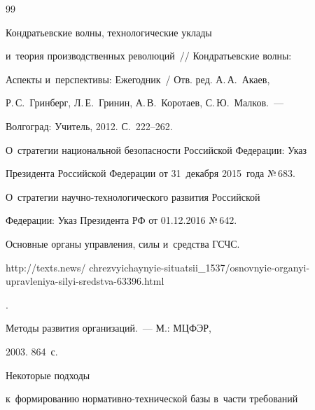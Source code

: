    {\small\frenchspacing


{%




\begin{thebibliography}{99}





\vspace*{-3pt}







      Кондратьевские волны, технологические уклады 


и~теория производственных революций~/\!\!/ Кондратьевские волны: 


Аспекты и~перспективы: Ежегодник~/ Отв. ред. А.\,А.~Акаев, 


Р.\,С.~Гринберг, Л.\,Е.~Гринин, А.\,В.~Коротаев, С.\,Ю.~Малков.~--- 


Волгоград: Учитель, 2012. С.~222--262.




     О~стратегии национальной безопасности Российской Федерации: Указ 


Президента Российской Федерации от 31~декабря 2015~года №\,683.




     О~стратегии научно-технологического развития Российской 


Федерации: Указ Президента РФ от 01.12.2016 №\,642.




     Основные органы управления, силы и~средства ГСЧС. {\sf 


http://texts.news/ chrezvyichaynyie-situatsii\_1537/osnovnyie-organyi-upravleniya-silyi-sredstva-63396.html}.




      Методы развития организаций.~--- М.: МЦФЭР, 


2003. 864~с.


     




      Некоторые подходы 


к~формированию нор\-ма\-тив\-но-тех\-ни\-че\-ской базы в~части требований 



\end{thebibliography}}}
